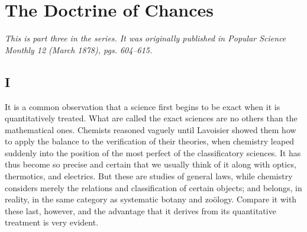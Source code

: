 


\section*{The Doctrine of Chances}
\emph{This is part three in the series. It was originally published in \emph{Popular Science Monthly} 12 (March 1878), pgs. 604--615.}

\subsection*{I}

It is a common observation that a science first begins to be exact when it is quantitatively treated. What are called the exact sciences are no others than the mathematical ones. Chemists reasoned vaguely until Lavoisier showed them how to apply the balance to the verification of their theories, when chemistry leaped suddenly into the position of the most perfect of the classificatory sciences. It has thus become so precise and certain that we usually think of it along with optics, thermotics, and electrics. But these are studies of general laws, while chemistry considers merely the relations and classification of certain objects; and belongs, in reality, in the same category as systematic botany and zo\"ology. Compare it with these last, however, and the advantage that it derives from its quantitative treatment is very evident.

